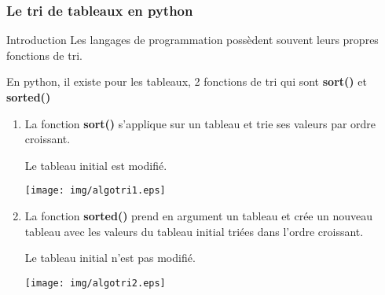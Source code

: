 \documentclass[9pt]{beamer}
\newcounter{num}
\begin{document}
\begin{frame}
\frametitle{Le tri de tableaux en python}

\begin{block}{Introduction}
Les langages de programmation possèdent souvent leurs propres fonctions de tri.

En python, il existe pour les tableaux, 2 fonctions de tri qui sont \textbf{sort()} et \textbf{sorted()}
\begin{enumerate}
\item La fonction \textbf{sort()} s'applique sur un tableau et trie ses valeurs par ordre croissant. 

Le tableau initial est modifié.
\begin{center}
\texttt{[image: img/algotri1.eps]}
\end{center}
\item La fonction \textbf{sorted()} prend en argument un tableau et crée un nouveau tableau avec les valeurs du tableau initial triées dans l'ordre croissant. 

Le tableau initial n'est pas modifié.
\begin{center}
\texttt{[image: img/algotri2.eps]}
\end{center}
\end{enumerate}
\end{block}

\end{frame}
\end{document}

